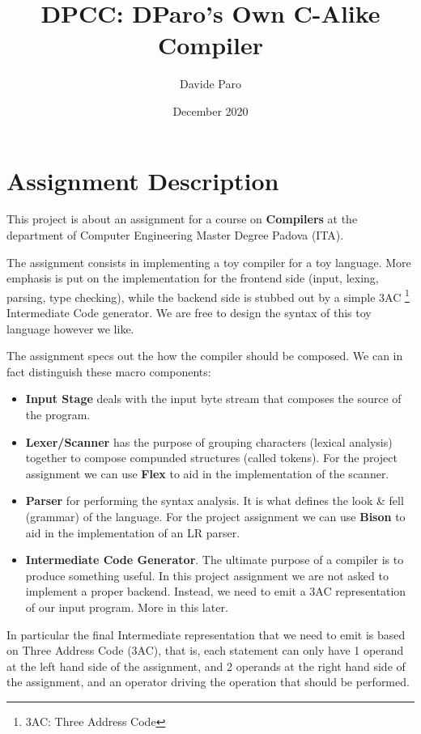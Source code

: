\documentclass[a4paper]{article}
\begin{document}
\tableofcontents


\title{DPCC: DParo's Own C-Alike Compiler}
\author{Davide Paro}
\date{December 2020}

\maketitle

\section{Assignment Description}
This project is about an assignment for a course on \textbf{Compilers}
at the department of Computer Engineering Master Degree Padova (ITA).


The assignment consists in implementing a toy compiler for a toy language. More emphasis
is put on the implementation for the frontend side (input, lexing, parsing, type checking), while
the backend side is stubbed out by a simple 3AC \footnote{3AC: Three Address Code} Intermediate Code
generator.
We are free to design the syntax of this toy language however we like.

The assignment specs out the how the compiler should be composed.
We can in fact distinguish these macro components:

\begin{itemize}
\item \textbf{Input Stage} deals with the input byte stream that composes
    the source of the program.
\item \textbf{Lexer/Scanner} has the purpose of grouping characters (lexical analysis)
    together to compose compunded
    structures (called tokens). For the project assignment we can use \textbf{Flex} to aid in
    the implementation of the scanner.
\item \textbf{Parser} for performing the syntax analysis. It is what defines the look \& fell
    (grammar) of the language. For the project assignment we can use \textbf{Bison} to aid in the
    implementation of an LR parser.
\item \textbf{Intermediate Code Generator}. The ultimate purpose of a compiler is to produce something
    useful. In this project assignment we are not asked to implement a proper backend. Instead,
    we need to emit a 3AC representation of our input program. More in this later.
\end{itemize}

In particular the final Intermediate representation that we need to emit is based on Three Address Code (3AC),
that is, each statement can only have 1 operand at the left hand side of the assignment, and 2 operands at the right hand side
of the assignment, and an operator driving the operation that should be performed.
\end{document}
